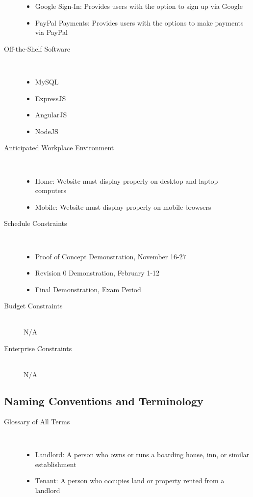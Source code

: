 \documentclass[12pt, titlepage]{article}
\begin{document}
\begin{description}
\begin{itemize}
    \item Google Sign-In: Provides users with the option to sign up via Google
    \item PayPal Payments: Provides users with the options to make payments
          via PayPal
    \end{itemize}
  \item[Off-the-Shelf Software] \hfill \\
    \begin{itemize}
    \item MySQL
    \item ExpressJS
    \item AngularJS
    \item NodeJS
    \end{itemize}
  \item[Anticipated Workplace Environment] \hfill \\
    \begin{itemize}
    \item Home: Website must display properly on desktop and laptop computers
    \item Mobile: Website must display properly on mobile browsers
    \end{itemize}
  \item[Schedule Constraints] \hfill \\
    \begin{itemize}
    \item Proof of Concept Demonstration, November 16-27
    \item Revision 0 Demonstration, February 1-12
    \item Final Demonstration, Exam Period
    \end{itemize}
  \item[Budget Constraints] \hfill \\
    N/A
  \item[Enterprise Constraints] \hfill \\
    N/A
\end{description}
\subsection{Naming Conventions and Terminology} %
\begin{description}
  \item[Glossary of All Terms] \hfill \\
    \begin{itemize}
    \item Landlord: A person who owns or runs a boarding house, inn, or similar
      establishment
    \item Tenant: A person who occupies land or property rented from a landlord
    \end{itemize}
\end{description}
\end{document}
